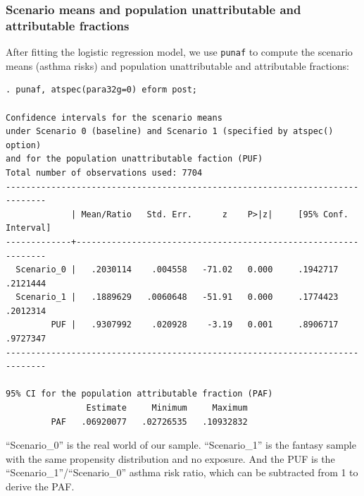 \documentclass[11pt]{beamer}
\begin{document}
\begin{frame}[fragile]
\frametitle{Scenario means and population unattributable and attributable fractions}

After fitting the logistic regression model,
we use \texttt{punaf} to compute the scenario means (asthma risks)
and population unattributable and attributable fractions:

\tiny
\begin{verbatim}
. punaf, atspec(para32g=0) eform post;

Confidence intervals for the scenario means
under Scenario 0 (baseline) and Scenario 1 (specified by atspec() option)
and for the population unattributable faction (PUF)
Total number of observations used: 7704
------------------------------------------------------------------------------
             | Mean/Ratio   Std. Err.      z    P>|z|     [95% Conf. Interval]
-------------+----------------------------------------------------------------
  Scenario_0 |   .2030114    .004558   -71.02   0.000     .1942717    .2121444
  Scenario_1 |   .1889629   .0060648   -51.91   0.000     .1774423    .2012314
         PUF |   .9307992    .020928    -3.19   0.001     .8906717    .9727347
------------------------------------------------------------------------------

95% CI for the population attributable fraction (PAF)
                Estimate     Minimum     Maximum 
         PAF   .06920077   .02726535   .10932832 
\end{verbatim}
\normalsize

``Scenario\_0'' is the real world of our sample.
``Scenario\_1'' is the fantasy sample with the same propensity distribution
and no exposure.
And the PUF is the ``Scenario\_1''/``Scenario\_0'' asthma risk ratio,
which can be subtracted from 1 to derive the PAF.

\end{frame}
\end{document}
